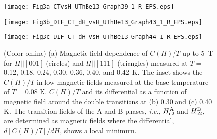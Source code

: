 \documentclass[twocolumn, prl]{revtex4}%
\newcommand{\correct}[1]{\textcolor{black}{#1}}
\begin{document}
\begin{centering}
\begin{figure}%
\texttt{[image: Fig3a\_CTvsH\_UThBe13\_Graph39\_1\_R\_EPS.eps]}
\begin{minipage}{4.1cm}
\texttt{[image: Fig3b\_DIF\_CT\_dH\_vsH\_UThBe13\_Graph43\_1\_R\_EPS.eps]}
\end{minipage}
\begin{minipage}{4.1cm}
\texttt{[image: Fig3c\_DIF\_CT\_dH\_vsH\_UThBe13\_Graph44\_1\_R\_EPS.eps]}
\end{minipage} 
\caption{ (Color online) (a) Magnetic-field dependence of  $C(H)/T$ up to 5~T
for $H$$||$$[001]$ (circles) and $H$$||$$[111]$ (triangles) measured at $T=$ 0.12, 0.18, 0.24, 0.30, 0.36, 
 0.40, and 0.42~K. 
 The inset shows the  $C(H)/T$ in low magnetic fields measured at  the \correct{base} temperature of  $T= $0.08 K. 
 $C(H)/T$ and its differential as a function of magnetic field around the double transitions at 
 (b) 0.30 and (c) 0.40 K. The transition fields of the A and B phases, \textit{i.e.}, 
 $H_{\rm c2}^{\rm A}$  and  $H_{\rm c2}^{\rm B}$,  are determined as magnetic fields where the differential, 
 $ d[C(H)/T]/dH$, shows a local minimum.
}
\end{figure}
\end{centering}
\end{document}
